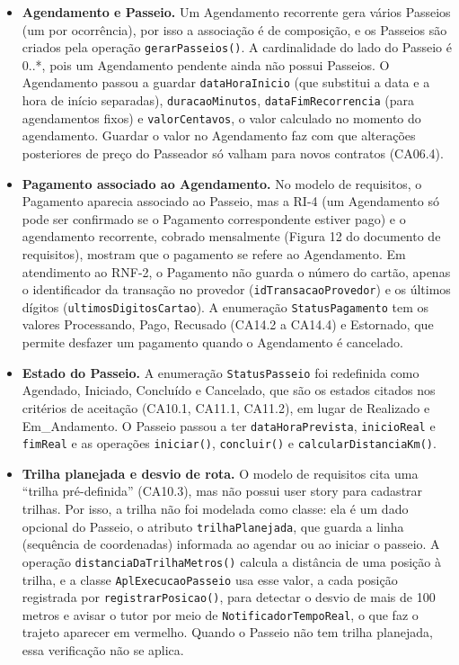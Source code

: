 \begin{itemize}
	\item \textbf{Agendamento e Passeio.} Um Agendamento recorrente gera vários Passeios (um por ocorrência), por isso a associação é de composição, e os Passeios são criados pela operação \texttt{gerarPasseios()}. A cardinalidade do lado do Passeio é 0..*, pois um Agendamento pendente ainda não possui Passeios. O Agendamento passou a guardar \texttt{dataHoraInicio} (que substitui a data e a hora de início separadas), \texttt{duracaoMinutos}, \texttt{dataFimRecorrencia} (para agendamentos fixos) e \texttt{valorCentavos}, o valor calculado no momento do agendamento. Guardar o valor no Agendamento faz com que alterações posteriores de preço do Passeador só valham para novos contratos (CA06.4).

	\item \textbf{Pagamento associado ao Agendamento.} No modelo de requisitos, o Pagamento aparecia associado ao Passeio, mas a RI-4 (um Agendamento só pode ser confirmado se o Pagamento correspondente estiver pago) e o agendamento recorrente, cobrado mensalmente (Figura 12 do documento de requisitos), mostram que o pagamento se refere ao Agendamento. Em atendimento ao RNF-2, o Pagamento não guarda o número do cartão, apenas o identificador da transação no provedor (\texttt{idTransacaoProvedor}) e os últimos dígitos (\texttt{ultimosDigitosCartao}). A enumeração \texttt{StatusPagamento} tem os valores Processando, Pago, Recusado (CA14.2 a CA14.4) e Estornado, que permite desfazer um pagamento quando o Agendamento é cancelado.

	\item \textbf{Estado do Passeio.} A enumeração \texttt{StatusPasseio} foi redefinida como Agendado, Iniciado, Concluído e Cancelado, que são os estados citados nos critérios de aceitação (CA10.1, CA11.1, CA11.2), em lugar de Realizado e Em\_Andamento. O Passeio passou a ter \texttt{dataHoraPrevista}, \texttt{inicioReal} e \texttt{fimReal} e as operações \texttt{iniciar()}, \texttt{concluir()} e \texttt{calcularDistanciaKm()}.

	\item \textbf{Trilha planejada e desvio de rota.} O modelo de requisitos cita uma ``trilha pré-definida'' (CA10.3), mas não possui user story para cadastrar trilhas. Por isso, a trilha não foi modelada como classe: ela é um dado opcional do Passeio, o atributo \texttt{trilhaPlanejada}, que guarda a linha (sequência de coordenadas) informada ao agendar ou ao iniciar o passeio. A operação \texttt{distanciaDaTrilhaMetros()} calcula a distância de uma posição à trilha, e a classe \texttt{AplExecucaoPasseio} usa esse valor, a cada posição registrada por \texttt{registrarPosicao()}, para detectar o desvio de mais de 100 metros e avisar o tutor por meio de \texttt{NotificadorTempoReal}, o que faz o trajeto aparecer em vermelho. Quando o Passeio não tem trilha planejada, essa verificação não se aplica.


\end{itemize}

